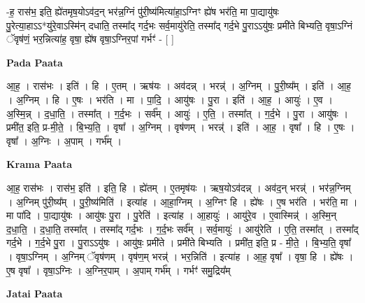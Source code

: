 \documentclass[17pt]{extarticle}
\begin{document}
-ह॒ रास॑भ॒ इति॒ ह्ये॑तमृष॒योऽव॑द॒न् भर॑न्न॒ग्निं पु॑री॒ष्य॑मित्या॑हा॒ऽग्निꣳ ह्ये॑ष भर॑ति॒ मा पा॒द्यायु॑षः पु॒रेत्या॒हाऽऽ*यु॑रे॒वाऽस्मि॑न् दधाति॒ तस्मा᳚द् गर्द॒भः सर्व॒मायु॑रेति॒ तस्मा᳚द् गर्द॒भे पु॒राऽऽयु॑षः॒ प्रमी॑ते बिभ्यति॒ वृषा॒ऽग्निं ॅवृष॑णं॒ भर॒न्नित्या॑ह॒ वृषा॒ ह्ये॑ष वृषा॒ऽग्निर॒पां गर्भꣳ॑ - [  ] \newline

\textbf{Pada Paata} \newline

आ॒ह॒ । रास॑भः । इति॑ । हि । ए॒तम् । ऋष॑यः । अव॑दन्न् । भरन्न्॑ । अ॒ग्निम् । पु॒री॒ष्य᳚म् । इति॑ । आ॒ह॒ । अ॒ग्निम् । हि । ए॒षः । भर॑ति । मा । पा॒दि॒ । आयु॑षः । पु॒रा । इति॑ । आ॒ह॒ । आयुः॑ । ए॒व । अ॒स्मि॒न्न् । द॒धा॒ति॒ । तस्मा᳚त् । ग॒र्द॒भः । सर्व᳚म् । आयुः॑ । ए॒ति॒ । तस्मा᳚त् । ग॒र्द॒भे । पु॒रा । आयु॑षः । प्रमी॑त॒ इति॒ प्र-मी॒ते॒ । बि॒भ्य॒ति॒ । वृषा᳚ । अ॒ग्निम् । वृष॑णम् । भरन्न्॑ । इति॑ । आ॒ह॒ । वृषा᳚ । हि । ए॒षः । वृषा᳚ । अ॒ग्निः । अ॒पाम् । गर्भ᳚म् ।  \newline


\textbf{Krama Paata} \newline

आ॒ह॒ रास॑भः । रास॑भ॒ इति॑ । इति॒ हि । ह्ये॑तम् । ए॒तमृष॑यः । ऋष॒योऽव॑दन्न् । अव॑द॒न् भरन्न्॑ । भर॑न्न॒ग्निम् । अ॒ग्निम् पु॑री॒ष्य᳚म् । पु॒री॒ष्य॑मिति॑ । इत्या॑ह । आ॒हा॒ग्निम् । अ॒ग्निꣳ हि । ह्ये॑षः । ए॒ष भर॑ति । भर॑ति॒ मा । मा पा॑दि । पा॒द्यायु॑षः । आयु॑षः पु॒रा । पु॒रेति॑ । इत्या॑ह । आ॒हायुः॑ । आयु॑रे॒व । ए॒वास्मिन्न्॑ । अ॒स्मि॒न् द॒धा॒ति॒ । द॒धा॒ति॒ तस्मा᳚त् । तस्मा᳚द् गर्द॒भः । ग॒र्द॒भः सर्व᳚म् । सर्व॒मायुः॑ । आयु॑रेति । ए॒ति॒ तस्मा᳚त् । तस्मा᳚द् गर्द॒भे । ग॒र्द॒भे पु॒रा । पु॒राऽऽयु॑षः । आयु॑षः॒ प्रमी॑ते । प्रमी॑ते बिभ्यति । प्रमी॑त॒ इति॒ प्र - मी॒ते॒ । बि॒भ्य॒ति॒ वृषा᳚ । वृषा॒ऽग्निम् । अ॒ग्निम् ॅवृष॑णम् । वृष॑ण॒म् भरन्न्॑ । भर॒न्निति॑ । इत्या॑ह । आ॒ह॒ वृषा᳚ । वृषा॒ हि । ह्ये॑षः । ए॒ष वृषा᳚ । वृषा॒ऽग्निः । अ॒ग्निर॒पाम् । अ॒पाम् गर्भ᳚म् । गर्भꣳ॑ समु॒द्रिय᳚म् \newline

\textbf{Jatai Paata} \newline
\end{document}
